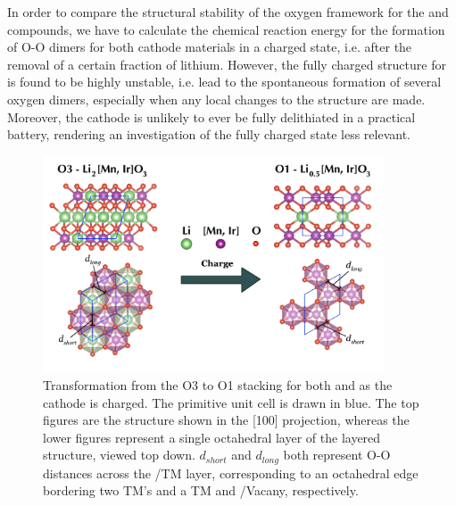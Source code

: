 \begin{refsection}

In order to compare the structural stability of the oxygen framework for the 
 and  compounds, we have to calculate the chemical 
reaction energy for the formation of O-O dimers for both cathode materials in 
a charged state, i.e. after the removal of a certain fraction of lithium. 
However, the fully charged structure for  is found to be highly 
unstable, i.e. lead to the spontaneous formation of several oxygen dimers, 
especially when any local changes to the structure are made. Moreover, the 
cathode is unlikely to ever be fully delithiated in a practical battery, 
rendering an investigation of the fully charged state less relevant. 

\begin{figure}[ht] 
\centering 
\captionsetup{width=0.9\linewidth}
\includegraphics[width=0.9\textwidth]{figures/batteries/structural_change.png} 
\caption{Transformation from the O3 to O1 stacking for both  and 
 as the cathode is charged. The primitive unit cell 
is drawn in blue. The top figures are the structure shown in the [100] 
projection, whereas the lower figures represent a single octahedral layer of 
the layered structure, viewed top down.  $d_{short}$ and $d_{long}$ both 
represent O-O distances across the /TM layer, corresponding to an 
octahedral edge bordering two TM's and a TM and /Vacany, respectively.} 
\label{batteries:fig-structural_change} 
\end{figure} 


\end{refsection}
